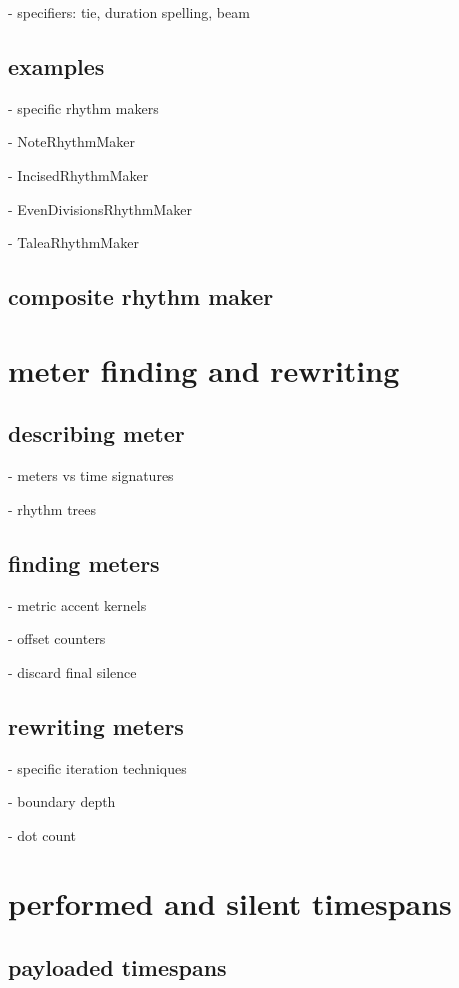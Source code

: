- specifiers: tie, duration spelling, beam

\subsection{examples}

- specific rhythm makers

    - NoteRhythmMaker

    - IncisedRhythmMaker

    - EvenDivisionsRhythmMaker

    - TaleaRhythmMaker

\subsection{composite rhythm maker}

\section{meter finding and rewriting}

\subsection{describing meter}

- meters vs time signatures

- rhythm trees

\subsection{finding meters}

- metric accent kernels

- offset counters

- discard final silence

\subsection{rewriting meters}

- specific iteration techniques

- boundary depth

- dot count

\section{performed and silent timespans}

\subsection{payloaded timespans}

